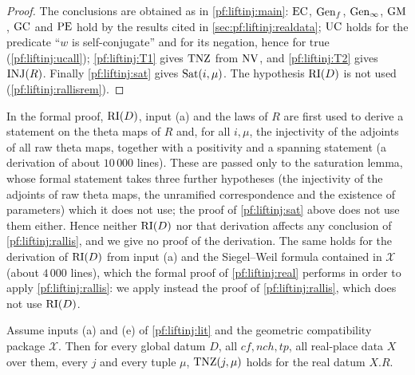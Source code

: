 \begin{proof}
The conclusions are obtained as in \cref{pf:liftinj:main}: $\mathrm{EC}$, $\mathrm{Gen}_f$, $\mathrm{Gen}_\infty$, $\mathrm{GM}$,
$\mathrm{GC}$ and $\mathrm{PE}$ hold by the results cited in \cref{sec:pf:liftinj:realdata}; $\mathrm{UC}$ holds for the predicate ``$w$ is
self-conjugate'' and for its negation, hence for $\mathrm{true}$ (\cref{pf:liftinj:ucall}); \ref{pf:liftinj:T1} gives $\mathrm{TNZ}$ from $\mathrm{NV}$,
and \ref{pf:liftinj:T2} gives $\mathrm{INJ}(R)$. Finally \cref{pf:liftinj:sat} gives $\mathrm{Sat}(i,\mu)$. The hypothesis $\mathrm{RI}(D)$ is not
used (\cref{pf:liftinj:rallisrem}).
\end{proof}

\begin{remark}\label{pf:liftinj:rallisrem}
In the formal proof, $\mathrm{RI}(D)$, input (a) and the laws of $R$ are first used to derive a statement on the theta maps of $R$ and, for all $i,\mu$,
the injectivity of the adjoints of all raw theta maps, together with a positivity and a spanning statement (a derivation of about $10\,000$ lines). These
are passed only to the saturation lemma, whose formal statement takes three further hypotheses (the injectivity of the adjoints of raw theta maps, the
unramified correspondence and the existence of parameters) which it does not use; the proof of \cref{pf:liftinj:sat} above does not use them either.
Hence neither $\mathrm{RI}(D)$ nor that derivation affects any conclusion of \cref{pf:liftinj:rallis}, and we give no proof of the derivation. The same
holds for the derivation of $\mathrm{RI}(D)$ from input (a) and the Siegel--Weil formula contained in $\mathcal X$ (about $4\,000$ lines), which the
formal proof of \cref{pf:liftinj:real} performs in order to apply \cref{pf:liftinj:rallis}: we apply instead the proof of \cref{pf:liftinj:rallis}, which
does not use $\mathrm{RI}(D)$.
\end{remark}

\begin{theorem}\label{pf:liftinj:real}
Assume inputs (a) and (e) of \cref{pf:liftinj:lit} and the geometric compatibility package $\mathcal X$. Then for every global datum $D$, all
$\mathit{cf},\mathit{nch},\mathit{tp}$, all real-place data $X$ over them, every $j$ and every tuple $\mu$, $\mathrm{TNZ}(j,\mu)$ holds for the real
datum $X.R$.
\end{theorem}

